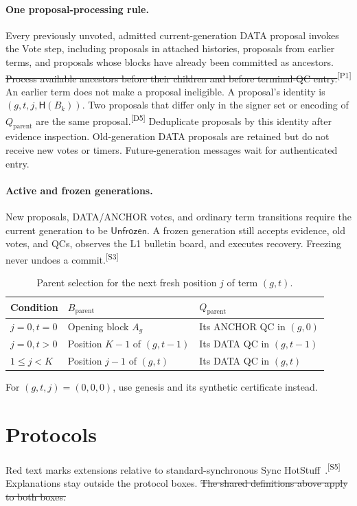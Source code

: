 \documentclass[11pt,a4paper]{article}
\newcommand{\RR}[1]{{\color{rrRed}#1}}
\newcommand{\NEW}[1]{{\color{diffNew}#1}}
\newcommand{\DEL}[1]{{\color{diffDel}\sout{#1}}}
\newcommand{\CH}[1]{\textsuperscript{\color{diffNew}\sffamily\scriptsize[#1]}}
\newcommand{\NEW}[1]{#1}
\newcommand{\DEL}[1]{}
\newcommand{\CH}[1]{}
\newcommand{\Hash}{\mathsf H}
\newcommand{\tagg}[1]{\ensuremath{\mathsf{#1}}}
\newcounter{protocol}
\begin{document}
\paragraph{One proposal-processing rule.}
Every previously unvoted, admitted current-generation DATA proposal invokes
the Vote step, including proposals in attached histories, proposals from
earlier terms, and proposals whose blocks have already been committed as
ancestors. \DEL{Process available ancestors before their children and
before terminal-QC entry.}\CH{P1} An earlier term does not make a proposal
ineligible. \NEW{A proposal's identity is $(g,t,j,\Hash(B_k))$. Two
proposals that differ only in the signer set or encoding of
$Q_{\mathrm{parent}}$ are the same proposal.}\CH{D5} Deduplicate proposals
by this identity after evidence inspection. Old-generation DATA proposals
are retained but do not receive new votes or timers. Future-generation
messages wait for authenticated entry.

\paragraph{Active and frozen generations.}
New proposals, DATA/ANCHOR votes, and ordinary term transitions require
the current generation to be \tagg{Unfrozen}. A frozen generation still
accepts evidence, old votes, and QCs, observes the L1 bulletin board, and
executes recovery. \NEW{Freezing never undoes a commit.}\CH{S3}

\begin{table}[htbp]\centering\small
\caption{Parent selection for the next fresh position $j$ of term $(g,t)$.}
\label{tab:parent}
\begin{tabularx}{\linewidth}{@{}l Y Y@{}}
\toprule
Condition & $B_{\mathrm{parent}}$ & $Q_{\mathrm{parent}}$\\
\midrule
$j=0,t=0$ & Opening block $A_g$ & Its ANCHOR QC in $(g,0)$\\
$j=0,t>0$ & Position $K-1$ of $(g,t-1)$ & Its DATA QC in $(g,t-1)$\\
$1\le j<K$ & Position $j-1$ of $(g,t)$ & Its DATA QC in $(g,t)$\\
\bottomrule
\end{tabularx}
\smallskip
For $(g,t,j)=(0,0,0)$, use genesis and its \NEW{synthetic} certificate instead.
\end{table}

\section{Protocols}
\label{sec:protocols}
\RR{Red text} marks extensions relative to standard-synchronous
Sync HotStuff~\cite{sync}.\CH{S5} Explanations stay outside the protocol
boxes. \DEL{The shared definitions above apply to both boxes.}
\end{document}
